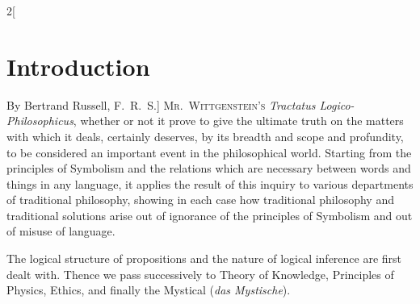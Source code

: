\documentclass[oneside,openany,12pt]{book}
\begin{document}
\clearpage{}\begin{multicols}{2}[\section*{Introduction}By Bertrand Russell, F.\ R.\ S.]
\noindent%
\textsc{Mr.\ Wittgenstein's} \emph{Tractatus Logico-Phil\-o\-soph\-i\-cus}, whether or not it prove to give the ultimate truth on the matters with which it deals, certainly deserves, by its breadth and scope and profundity, to be considered an important event in the philosophical world. Starting from the principles of Symbolism and the relations which are necessary between words and things in any language, it applies the result of this inquiry to various departments of traditional philosophy, showing in each case how traditional philosophy and traditional solutions arise out of ignorance of the principles of Symbolism and out of misuse of language.

The logical structure of propositions and the nature of logical inference are first dealt with. Thence we pass successively to Theory of Knowledge, Principles of Physics, Ethics, and finally the Mystical (\emph{das Mystische}).


\end{multicols}
\end{document}
